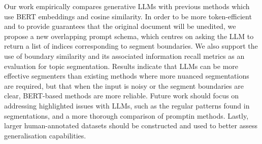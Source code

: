 
Our work empirically compares generative LLMs with previous methods which use BERT embeddings and cosine similarity. In order to be more token-efficient and to provide guarantees that the original document will be unedited, we propose a new overlapping prompt schema, which centres on asking the LLM to return a list of indices corresponding to segment boundaries. We also support the use of boundary similarity and its associated information recall metrics as an evaluation for topic segmentation. Results indicate that LLMs can be more effective segmenters than existing methods where more nuanced segmentations are required, but that when the input is noisy or the segment boundaries are clear, BERT-based methods are more reliable. Future work should focus on addressing highlighted issues with LLMs, such as the regular patterns found in segmentations, and a more thorough comparison of promptin methods. Lastly, larger human-annotated datasets should be constructed and used to better assess generalisation capabilities.